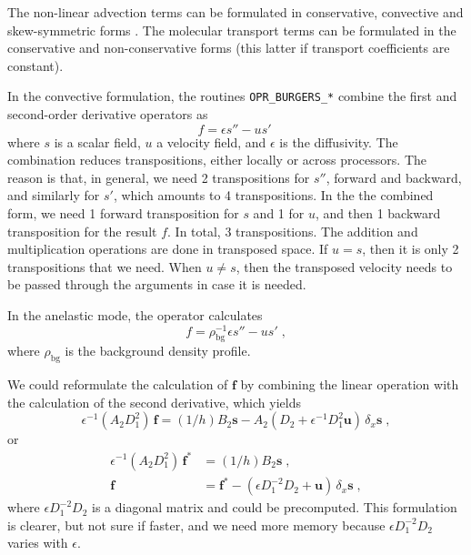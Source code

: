 The non-linear advection terms can be formulated in conservative, convective and skew-symmetric forms \citep{Blaisdell:1996,Kravchenko:1997}. The molecular transport terms can be formulated in the conservative and non-conservative forms (this latter if transport coefficients are constant).

In the convective formulation, the routines {\tt OPR\_BURGERS\_*} combine the first and second-order derivative operators as
\begin{equation}
f=\epsilon s'' - u s'\;
\end{equation}
where $s$ is a scalar field, $u$ a velocity field, and $\epsilon$ is the diffusivity. The combination reduces transpositions, either locally or across processors. The reason is that, in general, we need 2 transpositions for $s''$, forward and backward, and similarly for $s'$, which amounts to 4 transpositions. In the the combined form, we need 1 forward transposition for $s$ and 1 for $u$, and then 1 backward transposition for the result $f$. In total, 3 transpositions. The addition and multiplication operations are done in transposed space. If $u= s$, then it is only 2 transpositions that we need. When $u\ne s$, then the transposed velocity needs to be passed through the arguments in case it is needed.

In the anelastic mode, the operator calculates
\begin{equation}
f=\rho_\mathrm{bg}^{-1}\epsilon s'' - u s'\;,
\end{equation}
where $\rho_\mathrm{bg}$ is the background density profile.

We could reformulate the calculation of $\mathbf{f}$ by combining the linear operation with the calculation of the second derivative, which yields
\begin{equation}
    \epsilon^{-1}(A_2D_1^2)\, \mathbf{f}=(1/h)B_2 \mathbf{s}
    - A_2(D_2 + \epsilon^{-1}D_1^2\mathbf{u})\,\delta_x  \mathbf{s} \;,
\end{equation}
or
\begin{subequations}
  \begin{align}
    \epsilon^{-1}(A_2D_1^2)\, \mathbf{f}^*&=(1/h)B_2 \mathbf{s} \;,\\
    \mathbf{f}&= \mathbf{f}^*- (\epsilon D_1^{-2}D_2 + \mathbf{u})\,\delta_x  \mathbf{s} \;,
  \end{align}
\end{subequations}
where $\epsilon D_1^{-2}D_2$ is a diagonal matrix and could be precomputed. This formulation is clearer, but not sure if faster, and we need more memory because $\epsilon D_1^{-2}D_2$ varies with $\epsilon$.

